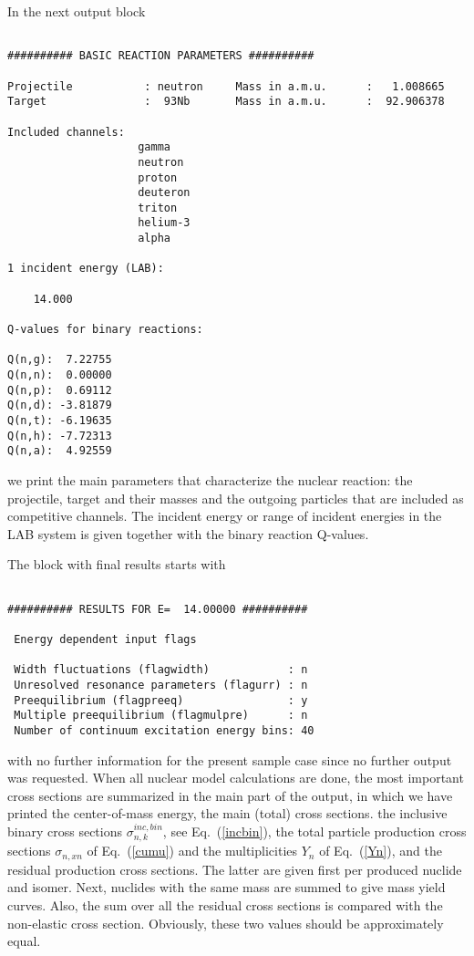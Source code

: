 \begin{samplecase}
In the next output block

{\small \begin{verbatim}

########## BASIC REACTION PARAMETERS ##########
 
Projectile           : neutron     Mass in a.m.u.      :   1.008665
Target               :  93Nb       Mass in a.m.u.      :  92.906378
 
Included channels:
                    gamma
                    neutron
                    proton
                    deuteron
                    triton
                    helium-3
                    alpha
 
1 incident energy (LAB):
 
    14.000
 
Q-values for binary reactions:
 
Q(n,g):  7.22755
Q(n,n):  0.00000
Q(n,p):  0.69112
Q(n,d): -3.81879
Q(n,t): -6.19635
Q(n,h): -7.72313    
Q(n,a):  4.92559
\end{verbatim} } \renewcommand{\baselinestretch}{1.07}\small\normalsize
\noindent
we print the main parameters that characterize the nuclear 
reaction: the projectile, target and their masses and the outgoing particles 
that are included as competitive channels. The incident energy or range of 
incident energies in the LAB system is given together with the binary reaction
Q-values.

The block with final results starts with

{\small \begin{verbatim}

########## RESULTS FOR E=  14.00000 ##########

 Energy dependent input flags

 Width fluctuations (flagwidth)            : n
 Unresolved resonance parameters (flagurr) : n
 Preequilibrium (flagpreeq)                : y
 Multiple preequilibrium (flagmulpre)      : n
 Number of continuum excitation energy bins: 40
\end{verbatim} } \renewcommand{\baselinestretch}{1.07}\small\normalsize
\noindent
with no further information for the present sample case since no further output 
was requested.
When all nuclear model calculations are done, the most important cross sections 
are summarized in the main part of the output,
in which we have printed the center-of-mass energy, the main (total) cross 
sections.
the inclusive binary cross sections $\sigma^{inc,bin}_{n,k}$, see 
Eq.~(\ref{incbin}), the total particle production cross sections 
$\sigma_{n,xn}$ of Eq.~(\ref{cumu}) and the multiplicities $Y_{n}$ of
Eq.~(\ref{Yn}),
and the residual production cross sections. The latter are given first
per produced nuclide and isomer. Next, nuclides with the same mass are summed 
to give mass yield curves. Also, the sum over all the residual cross sections
is compared with the non-elastic cross section. Obviously, these two values
should be approximately equal.


\end{samplecase}
